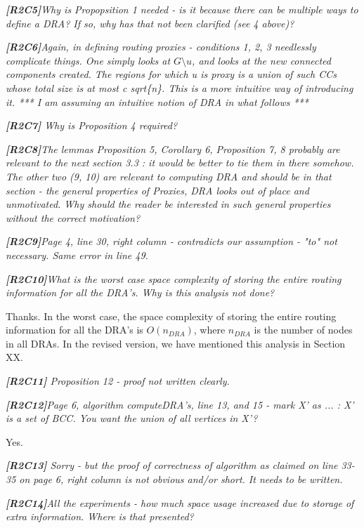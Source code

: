 \documentclass[11pt]{letter}
\newcommand{\vs}{\vspace{1ex}}
\newcommand{\svs}{\vspace{0.36ex}}
\begin{document}
\vs
\noindent
{\em{\bf[R2C5]}Why is Propopsition 1 needed - is it because there can be multiple ways to define a DRA? If so, why has that not been clarified (see 4 above)?}
\svs

\vs
\noindent
{\em{\bf[R2C6]}Again, in defining routing proxies - conditions 1, 2, 3 needlessly
complicate things. One simply looks at $G \setminus u$, and looks at the
new connected components created. The regions for which u is proxy
is a union of such CCs whose total size is at most c sqrt\{n\}. This
is a more intuitive way of introducing it.
*** I am assuming an intuitive notion of DRA in what follows ***
}
\svs

\vs
\noindent
{\em{\bf[R2C7]} Why is Proposition 4 required?}
\svs


\vs
\noindent
{\em{\bf[R2C8]}The lemmas Proposition 5, Corollary 6, Proposition 7, 8 probably
are relevant to the next section 3.3 : it would be better to tie them
in there somehow. The other two (9, 10) are relevant to computing DRA
and should be in that section - the general properties of Proxies, DRA
looks out of place and unmotivated. Why should the reader be
interested
in such general properties without the correct motivation?
}
\svs

\vs
\noindent
{\em{\bf[R2C9]}Page 4, line 30, right column - contradicts our assumption - "to" not necessary. Same error in line 49.}
\svs

\vs
\noindent
{\em{\bf[R2C10]}What is the worst case space complexity of storing the entire routing information for all the DRA's. Why is this analysis not done?}
\svs

Thanks. In the worst case, the space complexity of storing the entire routing information for all the DRA's is $O(n_{DRA})$, where $n_{DRA}$ is the number of nodes in all DRAs. In the revised version, we have mentioned this analysis in Section XX.

\vs
\noindent
{\em{\bf[R2C11]} Proposition 12 - proof not written clearly.}
\svs

\vs
\noindent
{\em{\bf[R2C12]}Page 6, algorithm computeDRA's, line 13, and 15 - mark X' as ... : X' is a set of BCC. You want the union of all vertices in X'?}
\svs

Yes.


\vs
\noindent
{\em{\bf[R2C13]} Sorry - but the proof of correctness of algorithm as claimed on line 33-35 on page 6, right column is not obvious and/or short. It needs to be written.}
\svs

\vs
\noindent
{\em{\bf[R2C14]}All the experiments - how much space usage increased due to storage of extra information. Where is that presented?}
\end{document}
